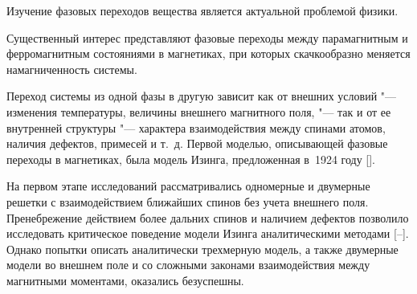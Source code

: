 





\date{17/XII/2014} %
















\makerutitle




Изучение фазовых переходов вещества является актуальной проблемой физики.

Существенный интерес представляют фазовые переходы между парамагнитным и ферромагнитным состояниями в магнетиках, при которых скачкообразно меняется намагниченность системы. 

Переход системы из одной фазы в другую зависит как от внешних условий "--- изменения температуры, величины внешнего магнитного поля, "--- так и от ее внутренней структуры "--- характера взаимодействия между спинами атомов, наличия дефектов, примесей и т.~д. Первой моделью, описывающей фазовые переходы в магнетиках, была модель Изинга, предложенная в~1924 году []. 

На первом этапе исследований рассматривались одномерные и двумерные решетки с взаимодействием ближайших спинов без учета внешнего поля. Пренебрежение действием более дальних спинов и наличием дефектов позволило исследовать критическое поведение модели Изинга аналитическими методами [--]. Однако попытки описать аналитически трехмерную модель, а также двумерные модели во внешнем поле и со сложными законами взаимодействия между магнитными моментами, оказались безуспешны. 

